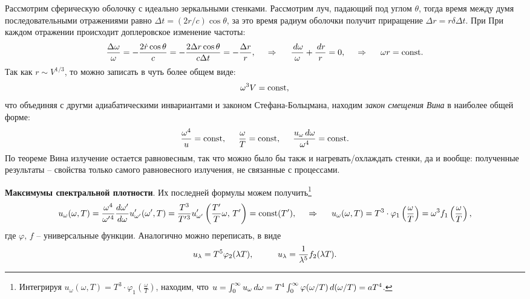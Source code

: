 Рассмотрим сферическую оболочку с идеально зеркальными стенками. Рассмотрим луч, падающий под углом $\theta$, тогда время между думя последовательными отражениями равно $\Delta t = (2r/c) \cos \theta$, за это время радиум оболочки получит приращение $\Delta r = r\delta \Delta t$. При При каждом отражении происходит доплеровское изменение частоты:
\begin{equation*}
    \frac{\Delta \omega}{\omega} = - \frac{2 \dot{r} \cos \theta}{c} = - \frac{2 \Delta r \cos \theta}{c \Delta t} = - \frac{\Delta r}{r},
    \hspace{0.5cm} \Rightarrow \hspace{0.5cm}
    \frac{\, d \omega}{\omega} + \frac{\, d r}{r} = 0,
    \hspace{0.5cm} \Rightarrow \hspace{0.5cm}
    \omega r = \textnormal{const}.
\end{equation*}
Так как $r \sim V^{1/3}$, то можно записать в чуть более общем виде:
\begin{equation*}
    \omega^3 V = \textnormal{const},
\end{equation*}
что объединяя с другми адиабатическими инвариантами и законом Стефана-Больцмана, находим \textit{закон смещения Вина} в наиболее общей форме:
\begin{equation*}
    \frac{\omega^4}{u} = \textnormal{const},
    \hspace{5 mm} 
    \frac{\omega}{T} = \textnormal{const},
    \hspace{5 mm} 
    \frac{u_\omega \, d \omega}{\omega^4} = \textnormal{const}.
\end{equation*}
По теореме Вина излучение остается равновесным, так что можно было бы такж и нагревать/охлаждать стенки, да и вообще: полученные результаты -- свойства только самого равновесного излучения, не связанные с процессами.


\textbf{Максимумы спектральной плотности}. 
Их последней формулы можем получить\footnote{
    Интегрируя $u_\omega (\omega, T) = T^3 \cdot \varphi_1\left(\frac{\omega}{T}\right)$, находим, что
    $u = \int_{0}^{\infty} u_\omega \, d \omega = T^4 \int_{0}^{\infty} \varphi(\omega/T) \, d (\omega/T) = a T^4$.
}   
\begin{equation*}
    u_\omega (\omega, T) = \frac{\omega^4}{\omega'{}^4} \frac{d \omega'}{d \omega} u'_{\omega'} (\omega', T) = \frac{T^3}{T'{}^3} u'_{\omega'} \left(\frac{T'}{T} \omega,\, T'\right) = \textnormal{const}(T'),
    \hspace{0.5cm} \Rightarrow \hspace{0.5cm}  
    u_\omega (\omega, T) = T^3 \cdot \varphi_1\left(\frac{\omega}{T}\right) = \omega^3 f_1\left(\frac{\omega}{T}\right)
    ,
\end{equation*}
где $\varphi,\,  f$ -- универсальные функции. Аналогично можно переписать, в виде
\begin{equation*}
    u_\lambda = T^5 \varphi_2 (\lambda T),
    \hspace{10 mm}  
    u_\lambda = \frac{1}{\lambda^5} f_2(\lambda T).
\end{equation*}


